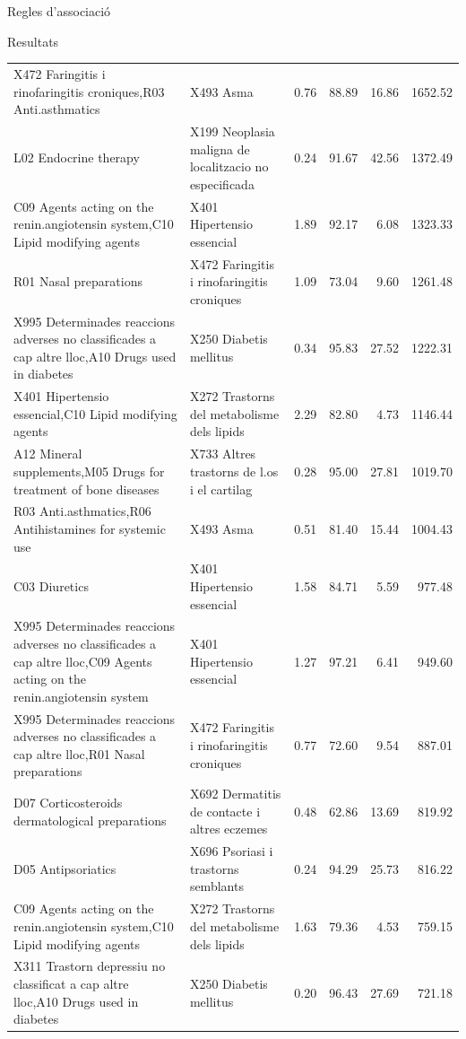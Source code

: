 \documentclass[ignorenonframetext,]{beamer}
\begin{document}
\begin{frame}{Regles d'associació}
\begin{block}{Resultats}
\begin{table}[ht]
{\begin{tabular}{llrrrr}
  X472 Faringitis i rinofaringitis croniques,R03 Anti.asthmatics & X493 Asma & 0.76 & 88.89 & 16.86 & 1652.52 \\ 
  L02 Endocrine therapy & X199 Neoplasia maligna de localitzacio no especificada & 0.24 & 91.67 & 42.56 & 1372.49 \\ 
  C09 Agents acting on the renin.angiotensin system,C10 Lipid modifying agents & X401 Hipertensio essencial & 1.89 & 92.17 & 6.08 & 1323.33 \\ 
  R01 Nasal preparations & X472 Faringitis i rinofaringitis croniques & 1.09 & 73.04 & 9.60 & 1261.48 \\ 
  X995 Determinades reaccions adverses no classificades a cap altre lloc,A10 Drugs used in diabetes & X250 Diabetis mellitus & 0.34 & 95.83 & 27.52 & 1222.31 \\ 
  X401 Hipertensio essencial,C10 Lipid modifying agents & X272 Trastorns del metabolisme dels lipids & 2.29 & 82.80 & 4.73 & 1146.44 \\ 
  A12 Mineral supplements,M05 Drugs for treatment of bone diseases & X733 Altres trastorns de l.os i el cartilag & 0.28 & 95.00 & 27.81 & 1019.70 \\ 
  R03 Anti.asthmatics,R06 Antihistamines for systemic use & X493 Asma & 0.51 & 81.40 & 15.44 & 1004.43 \\ 
  C03 Diuretics & X401 Hipertensio essencial & 1.58 & 84.71 & 5.59 & 977.48 \\ 
  X995 Determinades reaccions adverses no classificades a cap altre lloc,C09 Agents acting on the renin.angiotensin system & X401 Hipertensio essencial & 1.27 & 97.21 & 6.41 & 949.60 \\ 
  X995 Determinades reaccions adverses no classificades a cap altre lloc,R01 Nasal preparations & X472 Faringitis i rinofaringitis croniques & 0.77 & 72.60 & 9.54 & 887.01 \\ 
  D07 Corticosteroids dermatological preparations & X692 Dermatitis de contacte i altres eczemes & 0.48 & 62.86 & 13.69 & 819.92 \\ 
  D05 Antipsoriatics & X696 Psoriasi i trastorns semblants & 0.24 & 94.29 & 25.73 & 816.22 \\ 
  C09 Agents acting on the renin.angiotensin system,C10 Lipid modifying agents & X272 Trastorns del metabolisme dels lipids & 1.63 & 79.36 & 4.53 & 759.15 \\ 
  X311 Trastorn depressiu no classificat a cap altre lloc,A10 Drugs used in diabetes & X250 Diabetis mellitus & 0.20 & 96.43 & 27.69 & 721.18 \\ 

\end{tabular}}
\end{table}
\end{block}
\end{frame}
\end{document}

